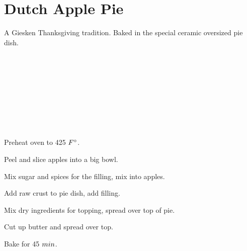 \section{Dutch Apple Pie}

\begin{recipestats}[
        servings=10,
        preptime=45~\minute,
        bakingtime=45~\minute,
        original=Jean Nelson,
    ]
\end{recipestats}

\begin{recipeabstract}
    A Giesken Thanksgiving tradition.
    Baked in the special ceramic oversized pie dish.
\end{recipeabstract}

\begin{ingredientcolumns}
    \begin{ingredientblock}[filling]
        \\
        \\
        \\
        \\
    \end{ingredientblock}

    \bigskip
    \begin{ingredientblock}[topping]
        \\
        \\
        \\
    \end{ingredientblock}
\end{ingredientcolumns}

\begin{preparation}
\item Preheat oven to 425 $\Fahrenheit$.
\item Peel and slice apples into a big bowl.
\item Mix sugar and spices for the filling, mix into apples.
\item Add raw crust to pie dish, add filling.
\item Mix dry ingredients for topping, spread over top of pie.
\item Cut up butter and spread over top.
\item Bake for 45 $\minute$.
\end{preparation}

\recipeend%
